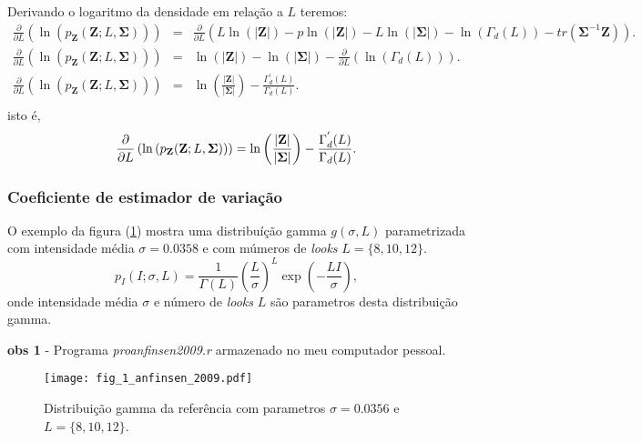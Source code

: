 Derivando o logaritmo da densidade em relação a $L$ teremos:
\begin{equation}\label{eqn96}
\begin{array}{ccc}
	\frac{\partial}{\partial L}\left(\ln{\left(p_{\mathbf{Z}}(\mathbf{Z};L,\mathbf{\Sigma})\right)}\right)&=&\frac{\partial}{\partial L}\left(L\ln{\left(|\mathbf{Z}|\right)}-p\ln{\left(|\mathbf{Z}|\right)} - L\ln{\left(|\mathbf{\Sigma}|\right)}-\ln{\left(\Gamma_d(L)\right)}-tr(\mathbf{\Sigma}^{-1}\mathbf{Z})\right). \\
	\frac{\partial}{\partial L}\left(\ln{\left(p_{\mathbf{Z}}(\mathbf{Z};L,\mathbf{\Sigma})\right)}\right)&=&\ln{\left(|\mathbf{Z}|\right)} - \ln{\left(|\mathbf{\Sigma}|\right)}-\frac{\partial}{\partial L}\left(\ln{\left(\Gamma_d(L)\right)}\right). \\
	\frac{\partial}{\partial L}\left(\ln{\left(p_{\mathbf{Z}}(\mathbf{Z};L,\mathbf{\Sigma})\right)}\right)&=&\ln{\left(\frac{|\mathbf{Z}|}{|\mathbf{\Sigma}|}\right)} - \frac{\Gamma^{'}_d(L)}{\Gamma_d(L)}. \\
\end{array}
\end{equation}
isto é, 
\begin{equation}\label{eqn97}
	\frac{\partial}{\partial L}\left(\ln{\left(p_{\mathbf{Z}}(\mathbf{Z};L,\mathbf{\Sigma})\right)}\right)=\ln{\left(\frac{|\mathbf{Z}|}{|\mathbf{\Sigma}|}\right)} - \frac{\Gamma^{'}_d(L)}{\Gamma_d(L)}. \\
\end{equation}
\subsubsection{Coeficiente de estimador de variação}

O exemplo da figura (\ref{fig3}) mostra uma distribuíção gamma $g(\sigma, L)$ parametrizada com intensidade média $\sigma=0.0358$ e com múmeros de {\it looks} $L=\{8,10,12\}$.
\begin{equation}\label{eqn98}
	p_{I}(I;\sigma,L)=\frac{1}{\Gamma(L)}\left(\frac{L}{\sigma}\right)^L \exp(-\frac{LI}{\sigma}), 
\end{equation}
onde intensidade média $\sigma$ e número de {\it looks} $L$ são parametros desta distribuição gamma.

{\bf obs 1} - Programa {\it proanfinsen2009.r} armazenado no meu computador pessoal.

\begin{figure}[hbt]
\centering
\texttt{[image: fig\_1\_anfinsen\_2009.pdf]}
	\caption{Distribuição gamma da referência \cite{ade} com parametros $\sigma=0.0356$ e $L=\{8,10,12\}$.}
\label{fig3}
\end{figure}

